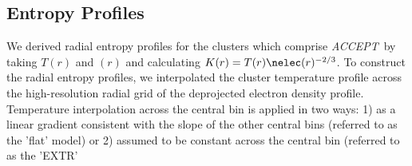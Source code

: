\documentclass[12pt, preprint]{aastex}
\newcommand{\accept}{\textit{ACCEPT}}
\begin{document}
\subsection{Entropy Profiles}
\label{sec:kpr}

We derived radial entropy profiles for the clusters which comprise
\accept\ by taking $T(r)$ and \nelec$(r)$ and calculating $K(r) =
T(r)\nelec(r)^{-2/3}$. To construct the radial entropy profiles, we
interpolated the cluster temperature profile across the
high-resolution radial grid of the deprojected electron density
profile. Temperature interpolation across the central bin is applied
in two ways: 1) as a linear gradient consistent with the slope of the
other central bins (referred to as the 'flat' model) or 2) assumed to
be constant across the central bin (referred to as the 'EXTR'
\end{document}
